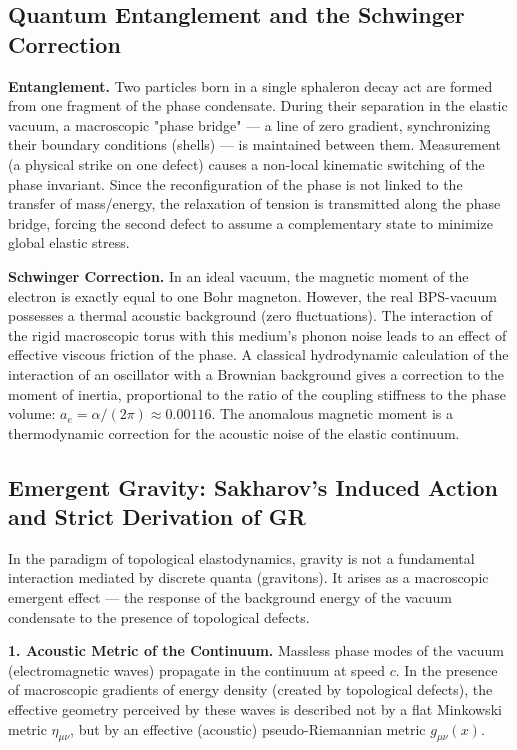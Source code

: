 \documentclass[11pt,a4paper]{article}
\begin{document}
\subsection{Quantum Entanglement and the Schwinger Correction}
\textbf{Entanglement.} Two particles born in a single sphaleron decay act are formed from one fragment of the phase condensate. During their separation in the elastic vacuum, a macroscopic "phase bridge" — a line of zero gradient, synchronizing their boundary conditions (shells) — is maintained between them. Measurement (a physical strike on one defect) causes a non-local kinematic switching of the phase invariant. Since the reconfiguration of the phase is not linked to the transfer of mass/energy, the relaxation of tension is transmitted along the phase bridge, forcing the second defect to assume a complementary state to minimize global elastic stress.

\textbf{Schwinger Correction.} In an ideal vacuum, the magnetic moment of the electron is exactly equal to one Bohr magneton. However, the real BPS-vacuum possesses a thermal acoustic background (zero fluctuations). The interaction of the rigid macroscopic torus with this medium's phonon noise leads to an effect of effective viscous friction of the phase. A classical hydrodynamic calculation of the interaction of an oscillator with a Brownian background gives a correction to the moment of inertia, proportional to the ratio of the coupling stiffness to the phase volume: $a_e = \alpha / (2\pi) \approx 0.00116$. The anomalous magnetic moment is a thermodynamic correction for the acoustic noise of the elastic continuum.
	
\subsection{Emergent Gravity: Sakharov's Induced Action \\ and Strict Derivation of GR}
	In the paradigm of topological elastodynamics, gravity is not a fundamental interaction mediated by discrete quanta (gravitons). It arises as a macroscopic emergent effect — the response of the background energy of the vacuum condensate to the presence of topological defects.
	
	\textbf{1. Acoustic Metric of the Continuum.}
	Massless phase modes of the vacuum (electromagnetic waves) propagate in the continuum at speed $c$. In the presence of macroscopic gradients of energy density (created by topological defects), the effective geometry perceived by these waves is described not by a flat Minkowski metric $\eta_{\mu\nu}$, but by an effective (acoustic) pseudo-Riemannian metric $g_{\mu\nu}(x)$. 
	
\end{document}

